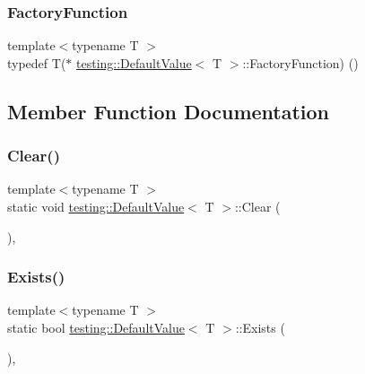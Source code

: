 \subsubsection{\texorpdfstring{FactoryFunction}{FactoryFunction}}
{\footnotesize\ttfamily template$<$typename T $>$ \\
typedef T($\ast$ \mbox{\hyperlink{classtesting_1_1DefaultValue}{testing\+::\+Default\+Value}}$<$ T $>$\+::Factory\+Function) ()}



\subsection{Member Function Documentation}
\mbox{\label{classtesting_1_1DefaultValue_a8163037b60311177cb211f070c512ee3}} 
\subsubsection{\texorpdfstring{Clear()}{Clear()}}
{\footnotesize\ttfamily template$<$typename T $>$ \\
static void \mbox{\hyperlink{classtesting_1_1DefaultValue}{testing\+::\+Default\+Value}}$<$ T $>$\+::Clear (\begin{DoxyParamCaption}{ }\end{DoxyParamCaption})\hspace{0.3cm}{\ttfamily [inline]}, {\ttfamily [static]}}

\mbox{\label{classtesting_1_1DefaultValue_aec1ff9b510af7dbb86c837fd2409fd70}} 
\subsubsection{\texorpdfstring{Exists()}{Exists()}}
{\footnotesize\ttfamily template$<$typename T $>$ \\
static bool \mbox{\hyperlink{classtesting_1_1DefaultValue}{testing\+::\+Default\+Value}}$<$ T $>$\+::Exists (\begin{DoxyParamCaption}{ }\end{DoxyParamCaption})\hspace{0.3cm}{\ttfamily [inline]}, {\ttfamily [static]}}

